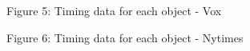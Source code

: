 \documentclass[12pt]{article}
\begin{document}
{
\vspace*{-0.6cm}
\begin{center}Figure 5: Timing data for each object - Vox\end{center}
}
\vspace*{-2cm}
\hspace*{-3cm}
{
\vspace*{-0.6cm}
\begin{center}Figure 6: Timing data for each object - Nytimes\end{center}
}
\end{document}
